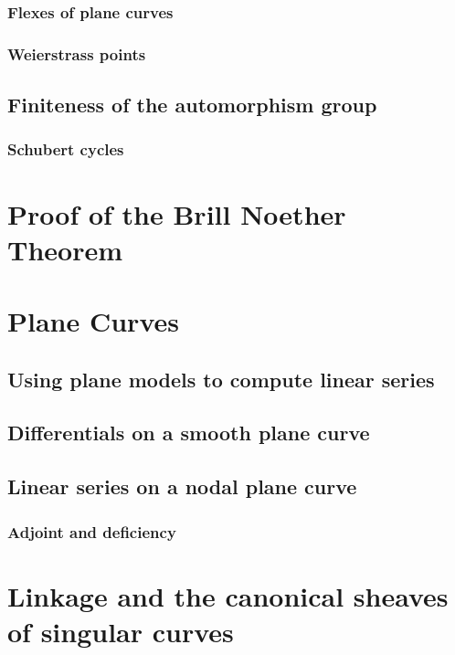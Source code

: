 \begin{theorem}
\subsection{Flexes of plane curves}\label{plane curve pluecker}
\subsection{Weierstrass points}\label{Weierstrass points}
\section{Finiteness of the automorphism group}\label{finiteness section}
\subsection{Schubert cycles}\label{Schubert1}

\chapter{Proof of the Brill Noether Theorem}
\label{Brill Noether proof chapter}
\label{BrillNoetherproofChapter}

\chapter{Plane Curves}
\label{PlaneCurvesChapter}
\section{Using plane models to compute linear series} \label{computing linear series}
\section{Differentials on a smooth plane curve}\label{canonical series on smooth plane curves}
\section{Linear series on a nodal plane curve}\label{linear series on nodal plane curves}
\subsection{Adjoint and deficiency}\label{adjoint ideal}

\chapter{Linkage and the canonical sheaves of singular curves}
\label{LiaisonChapter}\label{linkageChapter}\label{LinkageChapter}

\end{theorem}
